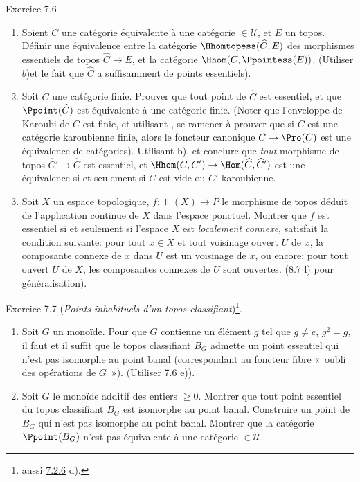 \begin{enonce*}[remark]{Exercice 7.6}
\begin{enumerate}
\item Soient $C$ une catégorie équivalente à une catégorie $\in
𝒰$, et $E$ un topos. Définir une équivalence entre la
catégorie $\Hhomtopess(\widehat{C},E)$ des morphismes essentiels de
topos $\widehat{C}\rightarrow E$, et la catégorie $\Hhom(C,
\Ppointess(E))$. (Utiliser $b$)\pageoriginale et le fait que
$\widehat{C}$ a suffisamment de points essentiels).

\item Soit $C$ une catégorie finie. Prouver que tout point de
$\widehat{C}$ est essentiel, et que $\Ppoint(\widehat{C})$ est
équivalente à une catégorie finie. (Noter que l'enveloppe de Karoubi
de $C$ est finie, et utilisant , se ramener à prouver
que si $C$ est une catégorie karoubienne finie, alors le foncteur
canonique $C\rightarrow \Pro(C)$ est une équivalence de catégories).
Utilisant b), et conclure que \emph{tout} morphisme de topos
$\widehat{C}'\rightarrow \widehat{C}$ est essentiel, et
$\Hhom(C,C')\rightarrow \Hom(\widehat{C},\widehat{C}')$ est une
équivalence si et seulement si $C$ est vide ou $C'$ karoubienne.

\item Soit $X$ un espace topologique, $f:\Top(X)\rightarrow P$ le
morphisme de topos déduit de l'application continue de $X$ dans
l'espace ponctuel. Montrer que $f$ est essentiel si et seulement si
l'espace $X$ est \emph{localement connexe}, \ie satisfait la
condition suivante: pour tout $x\in X$ et tout voisinage ouvert $U$
de $x$, la composante connexe de $x$ dans $U$ est un voisinage de
$x$, ou encore: pour tout ouvert $U$ de $X$, les composantes
connexes de $U$ sont ouvertes. (\cf \hyperref[IV.exer8.7]{8.7} l) pour
généralisation).
\end{enumerate}
\end{enonce*}

\begin{enonce*}[remark]{Exercice 7.7}
(\emph{Points inhabituels d'un topos classifiant})\footnote[1]{\cf
aussi \hyperref[IV.exer7.2.6]{7.2.6} d).}.
\begin{enumerate}
\renewcommand{\theenumi}{\alph{enumi}}
\renewcommand{\labelenumi}{\theenumi)}
\item Soit $G$ un monoïde. Pour que $G$ contienne un élément $g$ tel
que $g\neq e$, $g^2=g$, il faut et il suffit que le topos
classifiant $B_G$ admette un point essentiel qui n'est pas isomorphe
au point banal (correspondant au foncteur fibre « oubli des
opérations de $G$ »). (Utiliser \hyperref[IV.exer7.6]{7.6} e)).

\item Soit $G$ le monoïde additif des entiers $\geq 0$. Montrer que
tout point essentiel du topos classifiant $B_G$ est isomorphe au
point banal. Construire un point de $B_G$ qui n'est pas isomorphe au
point banal. Montrer que la catégorie $\Ppoint(B_G)$ n'est pas
équivalente à une catégorie $\in 𝒰$.
\end{enumerate}
\end{enonce*}

